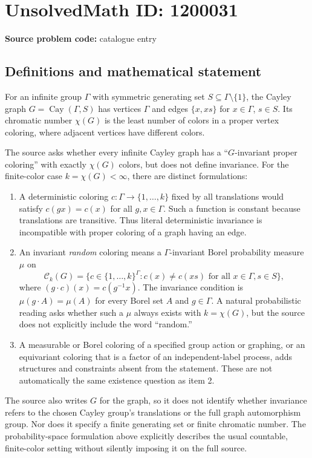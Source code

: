 \documentclass[11pt]{article}
\begin{document}
\section*{UnsolvedMath ID: 1200031}
\textbf{Source problem code:} catalogue entry
\subsection{Definitions and mathematical statement}
For an infinite group $\Gamma$ with symmetric generating set $S\subseteq\Gamma\setminus\{1\}$, the Cayley graph $G=\operatorname{Cay}(\Gamma,S)$ has vertices $\Gamma$ and edges $\{x,xs\}$ for $x\in\Gamma$, $s\in S$. Its chromatic number $\chi(G)$ is the least number of colors in a proper vertex coloring, where adjacent vertices have different colors.

The source asks whether every infinite Cayley graph has a ``$G$-invariant proper coloring'' with exactly $\chi(G)$ colors, but does not define invariance. For the finite-color case $k=\chi(G)<\infty$, there are distinct formulations:
\begin{enumerate}
\item A deterministic coloring $c:\Gamma\to\{1,\ldots,k\}$ fixed by all translations would satisfy $c(gx)=c(x)$ for all $g,x\in\Gamma$. Such a function is constant because translations are transitive. Thus literal deterministic invariance is incompatible with proper coloring of a graph having an edge.
\item An invariant \emph{random} coloring means a $\Gamma$-invariant Borel probability measure $\mu$ on
\[
\mathcal C_k(G)=\{c\in\{1,\ldots,k\}^{\Gamma}:c(x)\ne c(xs)\text{ for all }x\in\Gamma,s\in S\},
\]
where $(g\cdot c)(x)=c(g^{-1}x)$. The invariance condition is $\mu(g\cdot A)=\mu(A)$ for every Borel set $A$ and $g\in\Gamma$. A natural probabilistic reading asks whether such a $\mu$ always exists with $k=\chi(G)$, but the source does not explicitly include the word ``random.''
\item A measurable or Borel coloring of a specified group action or graphing, or an equivariant coloring that is a factor of an independent-label process, adds structures and constraints absent from the statement. These are not automatically the same existence question as item 2.
\end{enumerate}
The source also writes $G$ for the graph, so it does not identify whether invariance refers to the chosen Cayley group's translations or the full graph automorphism group. Nor does it specify a finite generating set or finite chromatic number. The probability-space formulation above explicitly describes the usual countable, finite-color setting without silently imposing it on the full source.
\end{document}
